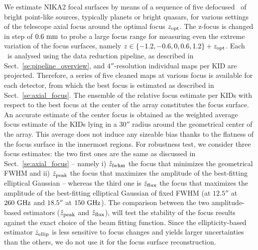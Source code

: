 We estimate NIKA2 focal surfaces by means of a sequence of five
defocused \bms\ of bright
point-like sources, typically planets or bright quasars, for various settings of
the telescope axial focus around the optimal focus $z_{\rm{opt}}$.
The z-focus is changed in step of $0.6~\rm{mm}$ to probe a large
focus range for measuring even the extreme variation of the focus surfaces,
namely $z \in \{-1.2, -0.6, 0, 0.6, 1.2 \} + z_{\rm{opt}}$.  Each
\bm\ is analysed using the data reduction pipeline, as described in
Sect.~\ref{se:pipeline_overview}, and $4''$-resolution individual maps per KID
are projected. %
Therefore, a series of
five cleaned maps at various focus is available for each detector, from which
the best focus is estimated as described in Sect.~\ref{se:axial_focus}. The
ensemble of the relative focus estimate per KIDs with respect to the best focus
at the center of the array constitutes the focus surface. An accurate estimate
of the center focus is obtained as the weighted average focus estimate of the
KIDs lying in a $30''$ radius around the geometrical center of the array. This
average does not induce any sizeable bias thanks to the flatness of the focus
surface in the innermost regions. For robustness test, we consider three focus
estimates: the two first ones are the same as discussed in
Sect.~\ref{se:axial_focus} -- namely i) $\hat z_{\rm{fwhm}}$ the focus that
minimizes the geometrical FWHM and ii) $\hat z_{\rm{peak}}$ the focus that
maximizes the amplitude of the best-fitting elliptical Gaussian -- whereas the
third one is $\hat z_{\rm{flux}}$ the focus that maximizes the amplitude of the
best-fitting elliptical Gaussian of fixed FWHM (at $12.5''$ at $260~\rm{GHz}$ and
$18.5''$ at $150~\rm{GHz}$). The comparison between the two amplitude-based
estimators ($\hat z_{\rm{peak}}$ and $\hat z_{\rm{flux}}$), will test the
stability of the focus results against the exact choice of the beam fitting
function. Since the ellipticity-based estimator $\hat z_{\rm{ellip}}$ is less
sensitive to focus changes and yields larger uncertainties than the others, we
do not use it for the focus surface reconstruction.


